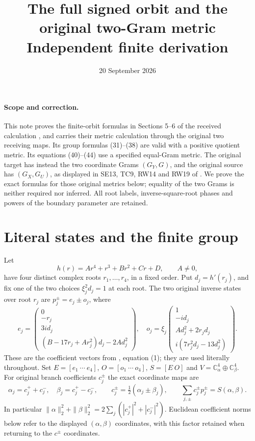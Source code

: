 \documentclass[11pt]{article}
\title{The full signed orbit and the original two-Gram metric\\
Independent finite derivation}
\author{}
\date{20 September 2026}
\newcommand{\C}{\mathbb C}
\begin{document}
\maketitle

\paragraph{Scope and correction.}
This note proves the finite-orbit formulas in Sections 5--6 of the
received calculation \cite{Incoming}, and carries their metric calculation
through the original two receiving maps.  Its group formulas (31)--(38)
are valid with a positive quotient metric.  Its equations (40)--(44)
use a specified equal-Gram metric.  The original target has instead
the two coordinate Grams $(G_Y,G)$, and the original source has
$(G_X,G_U)$, as displayed in SE13, TC9, RW14 and RW19 of \cite{Fable}.
We prove the exact formulas for those original metrics below; equality
of the two Grams is neither required nor inferred.
All root labels, inverse-square-root phases and powers of the boundary
parameter are retained.

\section{Literal states and the finite group}
Let
\[
 h(r)=Ar^4+r^3+Br^2+Cr+D,\qquad A\ne0,
 \tag{OM1}
\]
have four distinct complex roots $r_1,\ldots,r_4$, in a fixed order.
Put $d_j=h'(r_j)$, and fix one of the two choices
$\xi_j^2d_j=1$ at each root.  The two original inverse states over
root $r_j$ are $p_j^\pm=e_j\pm o_j$, where
\[
e_j=\begin{pmatrix}
0\\-r_j\\3id_j\\(B-17r_j+Ar_j^2)d_j-2Ad_j^2
\end{pmatrix},\quad
o_j=\xi_j\begin{pmatrix}
1\\-id_j\\Ad_j^2+2r_jd_j\\i(7r_j^2d_j-13d_j^2)
\end{pmatrix}.
\tag{OM2}
\]
These are the coefficient vectors from \cite{Incoming}, equation (1);
they are used literally throughout.  Set $E=[e_1\ \cdots\ e_4]$,
$O=[o_1\ \cdots\ o_4]$, $S=[E\ O]$ and
$V=\C^4_\alpha\oplus\C^4_\beta$.  For original branch coefficients
$c_j^\pm$ the exact coordinate maps are
\[
\alpha_j=c_j^++c_j^-,\quad \beta_j=c_j^+-c_j^-,
\qquad c_j^\pm=\tfrac12(\alpha_j\pm\beta_j),
\qquad \sum_{j,\pm}c_j^\pm p_j^\pm=S(\alpha,\beta).
\tag{OM3}
\]
In particular $\|\alpha\|_2^2+\|\beta\|_2^2=
2\sum_j(|c_j^+|^2+|c_j^-|^2)$.  Euclidean coefficient norms below
refer to the displayed $(\alpha,\beta)$ coordinates, with this factor
retained when returning to the $c^\pm$ coordinates.
\end{document}
